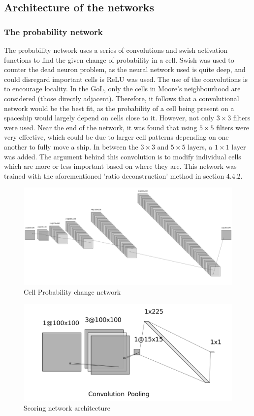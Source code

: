 \documentclass{l4proj}
\begin{document}
\subsection{Architecture of the networks}

\subsubsection{The probability network}

The probability network uses a series of convolutions and swish activation functions to find the given change of probability in a cell. Swish was used to counter the dead neuron problem, as the neural network used is quite deep, and could disregard important cells is ReLU was used. The use of the convolutions is to encourage locality. In the GoL, only the cells in Moore's neighbourhood are considered (those directly adjacent). Therefore, it follows that a convolutional network would be the best fit, as the probability of a cell being present on a spaceship would largely depend on cells close to it. However, not only $3 \times 3$ filters were used. Near the end of the network, it was found that using $5 \times 5$ filters were very effective, which could be due to larger cell patterns depending on one another to fully move a ship. In between the $3 \times 3$ and $5 \times 5$ layers, a $1 \times 1$ layer was added. The argument behind this convolution is to modify individual cells which are more or less important based on where they are. This network was trained with the aforementioned 'ratio deconstruction' method in section 4.4.2.

\begin{figure}[h]
\centering
\includegraphics[width=0.8\linewidth]{dissertation/images/diagrams/probability_network_diagram.png}
\caption{Cell Probability change network}
\label{fig:subim1}
\end{figure}
\begin{figure}[h]
\centering
\includegraphics[width=0.8\linewidth]{dissertation/images/diagrams/scoring_network_diagram.png}
\caption{Scoring network architecture}
\label{fig:subim1}
\end{figure}
\end{document}
